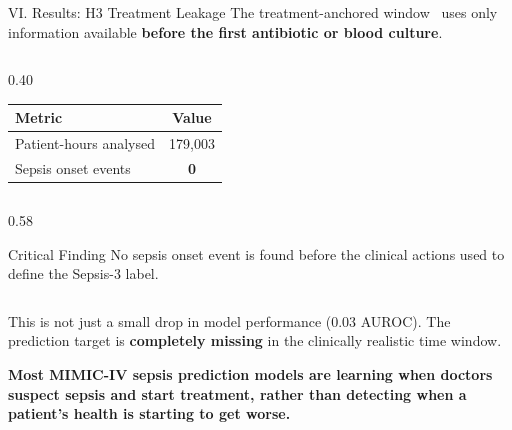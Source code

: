 \begin{frame}{VI. Results: H3 Treatment Leakage \confirmed}
The treatment-anchored window~\cite{kamran2024evaluation} uses only
information available \textbf{before the first antibiotic or blood culture}.

\vspace{6pt}
\begin{atucols}[c]

\begin{column}{0.40\textwidth}
\begin{center}\tablestyle
\begin{tabular}{lc}
\toprule
\textbf{Metric} & \textbf{Value} \\
\midrule
Patient-hours analysed & 179,003 \\
Sepsis onset events    & \textbf{0} \\
\bottomrule
\end{tabular}
\end{center}
\end{column}

\begin{column}{0.58\textwidth}
\begin{alertblock}{Critical Finding}
  No sepsis onset event is found before the clinical actions used to define
  the Sepsis-3 label.
\end{alertblock}
\end{column}

\end{atucols}

\vspace{6pt}
This is not just a small drop in model performance (0.03 AUROC). The
prediction target is \textbf{completely missing} in the clinically realistic
time window.

\vspace{4pt}
\textbf{Most MIMIC-IV sepsis prediction models are learning when doctors
suspect sepsis and start treatment, rather than detecting when a patient's
health is starting to get worse.}
\end{frame}


